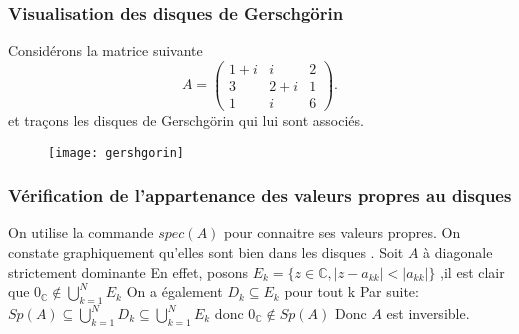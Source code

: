 \documentclass[a4paper,12pt]{article}
\begin{document}
\subsubsection{Visualisation des disques de Gerschgörin}

Considérons la matrice suivante
\begin{equation*}
    A = \left( \begin{array}{cccc}
      1+i & i & 2 \\
      3 & 2+i & 1\\
      1 & i   & 6
    \end{array} \right).
\end{equation*}
et traçons les disques de Gerschgörin qui lui sont associés.
\begin{figure}[h]
    \centering
    \texttt{[image: gershgorin]}
\end{figure}

\subsubsection{Vérification de l'appartenance des valeurs propres au disques}
On utilise la commande $spec(A)$ pour connaitre ses valeurs propres.
\newline
On constate graphiquement qu'elles sont bien dans les disques
\newline{}. Soit $A$ à diagonale strictement dominante
\newline
En effet, posons $E_k = \{z \in \mathbb{C}, |z - a_{kk}| < |a_{kk}| \}$
 ,il est clair que $0_{\mathbb{C}}\notin\bigcup\limits_{k=1}^N E_k$
\newline
On a également $D_k\subseteq E_k$ pour tout k
\newline
Par suite: $Sp(A)\subseteq\bigcup\limits_{k=1}^N D_k\subseteq\bigcup\limits_{k=1}^N E_k$
donc $0_{\mathbb{C}}\notin Sp(A)$
\newline
Donc $A$ est inversible.
\end{document}
